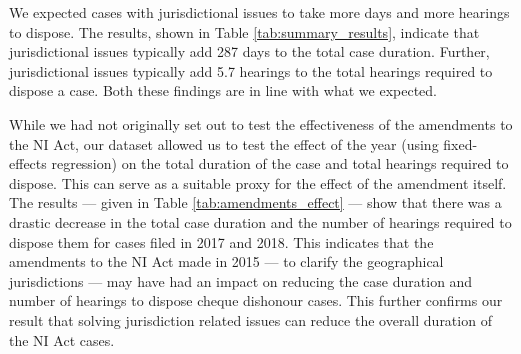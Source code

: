 \documentclass[12pt,a4paper]{article}
\begin{document}
We expected cases with jurisdictional issues to take more days and more hearings to dispose. The results, shown in Table \ref{tab:summary_results}, indicate that jurisdictional issues typically add 287 days to the total case duration. Further, jurisdictional issues typically add 5.7 hearings to the total hearings required to dispose a case. Both these findings are in line with what we expected.

While we had not originally set out to test the effectiveness of the amendments to the NI Act, our dataset allowed us to test the effect of the year (using fixed-effects regression) on the total duration of the case and total hearings required to dispose. This can serve as a suitable proxy for the effect of the amendment itself. The results --- given in Table \ref{tab:amendments_effect} --- show that there was a drastic decrease in the total case duration and the number of hearings required to dispose them for cases filed in 2017 and 2018. This indicates that the amendments to the NI Act made in 2015 --- to clarify the geographical jurisdictions --- may have had an impact on reducing the case duration and number of hearings to dispose cheque dishonour cases. This further confirms our result that solving jurisdiction related issues can reduce the overall duration of the NI Act cases.
\end{document}
